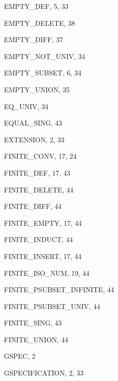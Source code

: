 \begin{theindex}
  \indexspace

  \item {\ptt EMPTY\_DEF}, 5, 33
  \item {\ptt EMPTY\_DELETE}, 38
  \item {\ptt EMPTY\_DIFF}, 37
  \item {\ptt EMPTY\_NOT\_UNIV}, 34
  \item {\ptt EMPTY\_SUBSET}, 6, 34
  \item {\ptt EMPTY\_UNION}, 35
  \item {\ptt EQ\_UNIV}, 34
  \item {\ptt EQUAL\_SING}, 43
  \item {\ptt EXTENSION}, 2, 33

  \indexspace

  \item {\ptt FINITE\_CONV}, 17, 24
  \item {\ptt FINITE\_DEF}, 17, 43
  \item {\ptt FINITE\_DELETE}, 44
  \item {\ptt FINITE\_DIFF}, 44
  \item {\ptt FINITE\_EMPTY}, 17, 44
  \item {\ptt FINITE\_INDUCT}, 44
  \item {\ptt FINITE\_INSERT}, 17, 44
  \item {\ptt FINITE\_ISO\_NUM}, 19, 44
  \item {\ptt FINITE\_PSUBSET\_INFINITE}, 44
  \item {\ptt FINITE\_PSUBSET\_UNIV}, 44
  \item {\ptt FINITE\_SING}, 43
  \item {\ptt FINITE\_UNION}, 44

  \indexspace

  \item {\ptt GSPEC}, 2
  \item {\ptt GSPECIFICATION}, 2, 33

  \indexspace


\end{theindex}
